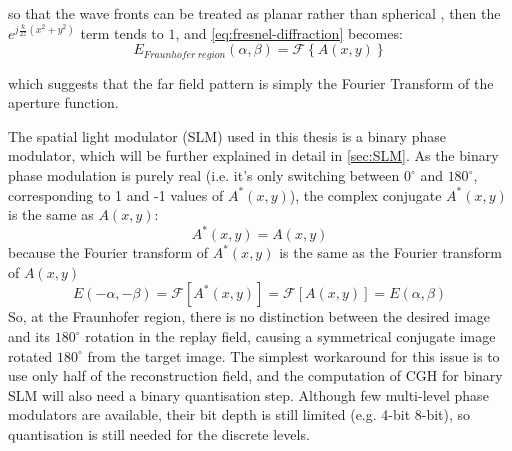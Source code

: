 so that the wave fronts can be treated as planar rather than spherical \cite{Daintith2009}, then the $e^{j\frac{k}{2z}(x^2+y^2)}$ term tends to $1$, and \cref{eq:fresnel-diffraction} becomes:
\begin{equation}
  E_{Fraunhofer\ region}(\alpha, \beta) = \mathcal{F} \left\{A(x,y)\right\}
\end{equation}

which suggests that the far field pattern is simply the Fourier Transform of the aperture function.

The spatial light modulator (SLM) used in this thesis is a binary phase modulator, which will be further explained in detail in \cref{sec:SLM}. As the binary phase modulation is purely real (i.e. it's only switching between $0^\circ$ and $180^\circ$, corresponding to 1 and -1 values of $A^*(x,y)$), the complex conjugate $A^*(x,y)$ is the same as $A(x,y)$:
\begin{equation} \label{eq:AequalsAstar}
  A^*(x,y) = A(x,y)
\end{equation}
because the Fourier transform of $A^*(x,y)$ is the same as the Fourier transform of $A(x,y)$
\begin{equation} \label{eq:AAstar}
  E(-\alpha, -\beta)=\mathcal{F}[A^*(x,y)]=\mathcal{F}[A(x,y)]=E(\alpha, \beta)
\end{equation}
So, at the Fraunhofer region, there is no distinction between the desired image and its $180^\circ$ rotation in the replay field, causing a symmetrical conjugate image rotated $180^\circ$ from the target image. The simplest workaround for this issue is to use only half of the reconstruction field, and the computation of CGH for binary SLM will also need a binary quantisation step. Although few multi-level phase modulators are available, their bit depth is still limited (e.g. 4-bit 8-bit), so quantisation is still needed for the discrete levels.


